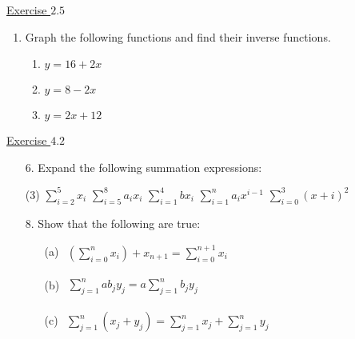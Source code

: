 \documentclass{./../../Latex/handout}
\begin{document}
\underline{Exercise $2.5$} 
\begin{enumerate}
\item Graph the following functions and find their inverse functions.
\begin{enumerate}
	\item $y = 16 + 2x$
	\item $y = 8-2x$
	\item $y = 2x+12 $ 
\end{enumerate}
\end{enumerate}

\underline{Exercise $4.2$} 

\begin{enumerate}
\item[6.]  Expand the following summation expressions:
\begin{tasks}(3)
\task[(a)] $\sum_{i=2}^5 x_i$
\task[(b)] $\sum_{i=5}^8 a_i x_i$
\task[(c)] $\sum_{i=1}^4 b x_i$
\task[(d)] $\sum_{i=1}^n a_i x^{i-1}$
\task[(e)] $\sum_{i=0}^3(x+i)^2$ \\
\end{tasks}

\item[8.] Show that the following are true:
\begin{enumerate}
\item[(a)] $\begin{aligned} \left(\sum_{i=0}^n x_i\right)+x_{n+1}=\sum_{i=0}^{n+1} x_i \end{aligned}$
\item[(b)] $\begin{aligned}\sum_{j=1}^n a b_j y_j=a \sum_{j=1}^n b_j y_j\end{aligned}$
\item[(c)] $\begin{aligned}\sum_{j=1}^n\left(x_j+y_j\right)=\sum_{j=1}^n x_j+\sum_{j=1}^n y_j\end{aligned}$ \\
\end{enumerate}
\end{enumerate}
\end{document}
